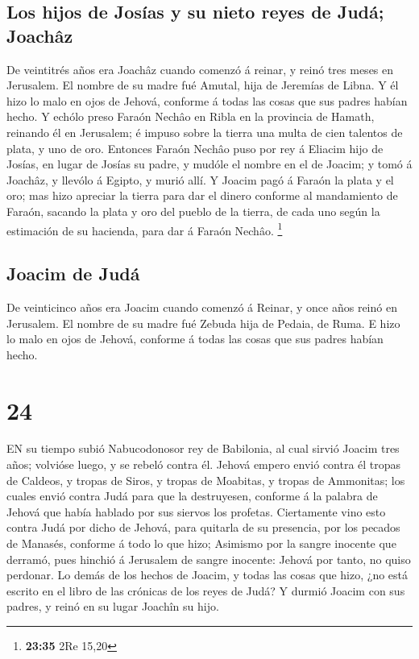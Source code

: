 \hypertarget{los-hijos-de-josuxedas-y-su-nieto-reyes-de-juduxe1-joachuxe2z}{%
\subsection{Los hijos de Josías y su nieto reyes de Judá;
Joachâz}\label{los-hijos-de-josuxedas-y-su-nieto-reyes-de-juduxe1-joachuxe2z}}

 De veintitrés años era Joachâz cuando comenzó á reinar, y
reinó tres meses en Jerusalem. El nombre de su madre fué Amutal, hija de
Jeremías de Libna.  Y él hizo lo malo en ojos de Jehová,
conforme á todas las cosas que sus padres habían hecho.  Y
echólo preso Faraón Nechâo en Ribla en la provincia de Hamath, reinando
él en Jerusalem; é impuso sobre la tierra una multa de cien talentos de
plata, y uno de oro.  Entonces Faraón Nechâo puso por rey á
Eliacim hijo de Josías, en lugar de Josías su padre, y mudóle el nombre
en el de Joacim; y tomó á Joachâz, y llevólo á Egipto, y murió allí.
 Y Joacim pagó á Faraón la plata y el oro; mas hizo
apreciar la tierra para dar el dinero conforme al mandamiento de Faraón,
sacando la plata y oro del pueblo de la tierra, de cada uno según la
estimación de su hacienda, para dar á Faraón Nechâo. \footnote{\textbf{23:35}
  2Re 15,20}

\hypertarget{joacim-de-juduxe1}{%
\subsection{Joacim de Judá}\label{joacim-de-juduxe1}}

 De veinticinco años era Joacim cuando comenzó á Reinar, y
once años reinó en Jerusalem. El nombre de su madre fué Zebuda hija de
Pedaia, de Ruma.  E hizo lo malo en ojos de Jehová,
conforme á todas las cosas que sus padres habían hecho.

\hypertarget{section-23}{%
\section{24}\label{section-23}}

 EN su tiempo subió Nabucodonosor rey de Babilonia, al cual
sirvió Joacim tres años; volvióse luego, y se rebeló contra él.
 Jehová empero envió contra él tropas de Caldeos, y tropas
de Siros, y tropas de Moabitas, y tropas de Ammonitas; los cuales envió
contra Judá para que la destruyesen, conforme á la palabra de Jehová que
había hablado por sus siervos los profetas.  Ciertamente
vino esto contra Judá por dicho de Jehová, para quitarla de su
presencia, por los pecados de Manasés, conforme á todo lo que hizo;
 Asimismo por la sangre inocente que derramó, pues hinchió á
Jerusalem de sangre inocente: Jehová por tanto, no quiso perdonar.
 Lo demás de los hechos de Joacim, y todas las cosas que
hizo, ¿no está escrito en el libro de las crónicas de los reyes de Judá?
 Y durmió Joacim con sus padres, y reinó en su lugar Joachîn
su hijo.

